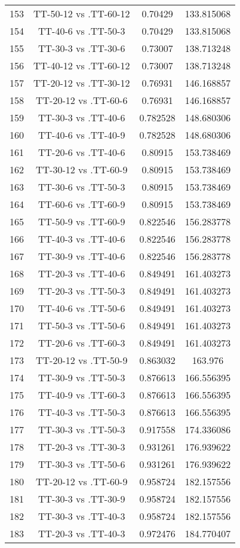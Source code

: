 \documentclass[a4paper,10pt]{article}
\begin{document}
\begin{landscape}
\begin{table}[!htp]
\begin{tabular}{cccc}
153&TT-50-12 vs .TT-60-12&0.70429&133.815068\\
154&TT-40-6 vs .TT-50-3&0.70429&133.815068\\
155&TT-30-3 vs .TT-30-6&0.73007&138.713248\\
156&TT-40-12 vs .TT-60-12&0.73007&138.713248\\
157&TT-20-12 vs .TT-30-12&0.76931&146.168857\\
158&TT-20-12 vs .TT-60-6&0.76931&146.168857\\
159&TT-30-3 vs .TT-40-6&0.782528&148.680306\\
160&TT-40-6 vs .TT-40-9&0.782528&148.680306\\
161&TT-20-6 vs .TT-40-6&0.80915&153.738469\\
162&TT-30-12 vs .TT-60-9&0.80915&153.738469\\
163&TT-30-6 vs .TT-50-3&0.80915&153.738469\\
164&TT-60-6 vs .TT-60-9&0.80915&153.738469\\
165&TT-50-9 vs .TT-60-9&0.822546&156.283778\\
166&TT-40-3 vs .TT-40-6&0.822546&156.283778\\
167&TT-30-9 vs .TT-40-6&0.822546&156.283778\\
168&TT-20-3 vs .TT-40-6&0.849491&161.403273\\
169&TT-20-3 vs .TT-50-3&0.849491&161.403273\\
170&TT-40-6 vs .TT-50-6&0.849491&161.403273\\
171&TT-50-3 vs .TT-50-6&0.849491&161.403273\\
172&TT-20-6 vs .TT-60-3&0.849491&161.403273\\
173&TT-20-12 vs .TT-50-9&0.863032&163.976\\
174&TT-30-9 vs .TT-50-3&0.876613&166.556395\\
175&TT-40-9 vs .TT-60-3&0.876613&166.556395\\
176&TT-40-3 vs .TT-50-3&0.876613&166.556395\\
177&TT-30-3 vs .TT-50-3&0.917558&174.336086\\
178&TT-20-3 vs .TT-30-3&0.931261&176.939622\\
179&TT-30-3 vs .TT-50-6&0.931261&176.939622\\
180&TT-20-12 vs .TT-60-9&0.958724&182.157556\\
181&TT-30-3 vs .TT-30-9&0.958724&182.157556\\
182&TT-30-3 vs .TT-40-3&0.958724&182.157556\\
183&TT-20-3 vs .TT-40-3&0.972476&184.770407\\

\end{tabular}
\end{table}
\end{landscape}
\end{document}
